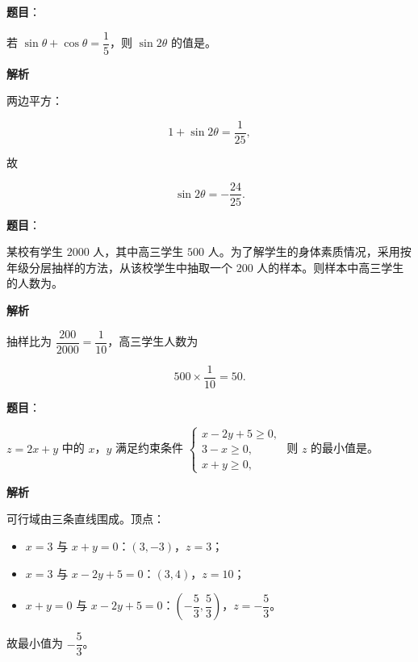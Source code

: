\begin{answer}

\textbf{题目}：

若 $\sin\theta+\cos\theta=\dfrac15$，则 $\sin2\theta$ 的值是\gkblank{}。

\textbf{解析}

两边平方：

\nopagebreak[4]
\[1+\sin2\theta=\frac1{25},\]

故

\nopagebreak[4]
\[\sin2\theta=-\frac{24}{25}.\]


\end{answer}
\begin{answer}

\textbf{题目}：

某校有学生 $2000$ 人，其中高三学生 $500$ 人。为了解学生的身体素质情况，采用按年级分层抽样的方法，从该校学生中抽取一个 $200$ 人的样本。则样本中高三学生的人数为\gkblank{}。

\textbf{解析}

抽样比为 $\dfrac{200}{2000}=\dfrac1{10}$，高三学生人数为

\nopagebreak[4]
\[500\times\frac1{10}=50.\]


\end{answer}
\begin{answer}

\textbf{题目}：

$z=2x+y$ 中的 $x$，$y$ 满足约束条件 $\begin{cases}x-2y+5\geqslant0,\\ 3-x\geqslant0,\\ x+y\geqslant0,\end{cases}$ 则 $z$ 的最小值是\gkblank{}。

\textbf{解析}

可行域由三条直线围成。顶点：

\begin{itemize}
\item $x=3$ 与 $x+y=0$：$(3,-3)$，$z=3$；
\item $x=3$ 与 $x-2y+5=0$：$(3,4)$，$z=10$；
\item $x+y=0$ 与 $x-2y+5=0$：$\left(-\dfrac53,\dfrac53\right)$，$z=-\dfrac53$。
\end{itemize}

故最小值为 $-\dfrac53$。


\end{answer}
